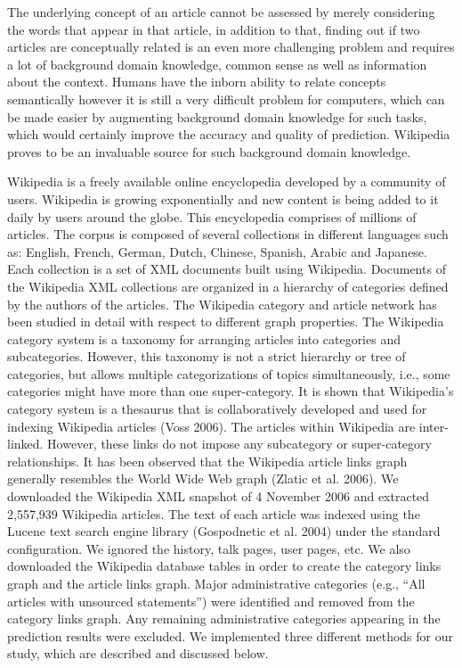 The underlying concept of an article cannot be assessed by merely considering the words that appear in that article, in addition to that, finding out if two articles are conceptually related is an even more challenging problem and requires a lot of background domain knowledge, common sense as well as information about the context. Humans have the inborn ability to relate concepts semantically however it is still a very difficult problem for computers, which can be made easier by augmenting background domain knowledge for such tasks, which would certainly improve the accuracy and quality of prediction. Wikipedia proves to be an invaluable source for such background domain knowledge.

Wikipedia is a freely available online encyclopedia developed by a community of users. Wikipedia is growing exponentially and new content is being added to it daily by users around the globe. This encyclopedia comprises of millions of articles. The corpus is composed of several collections in different languages such as: English, French, German, Dutch, Chinese, Spanish, Arabic and Japanese. 
Each collection is a set of XML documents built using Wikipedia. Documents of the Wikipedia XML collections are organized in a hierarchy of categories defined by the authors of the articles. The Wikipedia category and article network has been studied in detail with respect to different graph properties. The Wikipedia category system is a taxonomy for arranging articles into categories and subcategories.
However, this taxonomy is not a strict hierarchy or tree of categories, but allows multiple categorizations of topics simultaneously, i.e., some categories might have more than one super-category. It is shown that Wikipedia’s category system is a thesaurus that is collaboratively developed and used for indexing Wikipedia articles (Voss 2006). The articles within Wikipedia are inter-linked. However, these links do not impose any subcategory or super-category relationships. It has been observed that the Wikipedia article links graph generally resembles the World Wide Web graph (Zlatic et al. 2006).
We downloaded the Wikipedia XML snapshot of 4 November 2006 and extracted 2,557,939 Wikipedia articles. The text of each article was indexed using the Lucene text search engine library (Gospodnetic et al. 2004) under the standard configuration. We ignored the history, talk pages, user pages, etc. We also downloaded the Wikipedia database tables in order to create the category links graph and the article links graph. Major administrative categories (e.g., “All articles with unsourced statements”) were identified and removed from the category links graph. Any remaining administrative categories appearing in the prediction results were excluded. We implemented three different methods for our study, which are described and discussed below.

